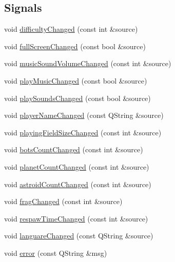 \subsection*{Signals}
\begin{DoxyCompactItemize}
\item 
void \hyperlink{class_gravitron_settings_a997bf69a2e778b7bbd6beefae8ee8578}{difficulty\+Changed} (const int \&source)
\item 
void \hyperlink{class_gravitron_settings_ac97163add79f61d978415fdc55beef2d}{full\+Screen\+Changed} (const bool \&source)
\item 
void \hyperlink{class_gravitron_settings_a481cf99de16e994c63c3dfeff94123fe}{music\+Sound\+Volume\+Changed} (const int \&source)
\item 
void \hyperlink{class_gravitron_settings_a101f009286632eb4f3c0f10274308200}{play\+Music\+Changed} (const bool \&source)
\item 
void \hyperlink{class_gravitron_settings_a87e9774036049c9593dc5779a94ba6a4}{play\+Sounds\+Changed} (const bool \&source)
\item 
void \hyperlink{class_gravitron_settings_ab12347fa7a95663bf557d703d82d980f}{player\+Name\+Changed} (const Q\+String \&source)
\item 
void \hyperlink{class_gravitron_settings_aaeb6b5aa718d90074b71a8da747d535e}{playing\+Field\+Size\+Changed} (const int \&source)
\item 
void \hyperlink{class_gravitron_settings_a28457660e35d741279ada2a98f6ebd4d}{bots\+Count\+Changed} (const int \&source)
\item 
void \hyperlink{class_gravitron_settings_ac4b5df1b082308bd710280080f1caee6}{planet\+Count\+Changed} (const int \&source)
\item 
void \hyperlink{class_gravitron_settings_a443c7369cc5836f6ea4f98de603ad9e5}{astroid\+Count\+Changed} (const int \&source)
\item 
void \hyperlink{class_gravitron_settings_a79ceaa5ff5b0e30a6b144a92a513c470}{frag\+Changed} (const int \&source)
\item 
void \hyperlink{class_gravitron_settings_aab8e8dddbae563d26becd6279d727788}{respaw\+Time\+Changed} (const int \&source)
\item 
void \hyperlink{class_gravitron_settings_a469a7cb1c07c6f9a9fb905ed535c4244}{languare\+Changed} (const Q\+String \&source)
\item 
void \hyperlink{class_gravitron_settings_a2a953f97e01ec9de394bd8b2d23c3bbc}{error} (const Q\+String \&msg)
\end{DoxyCompactItemize}
